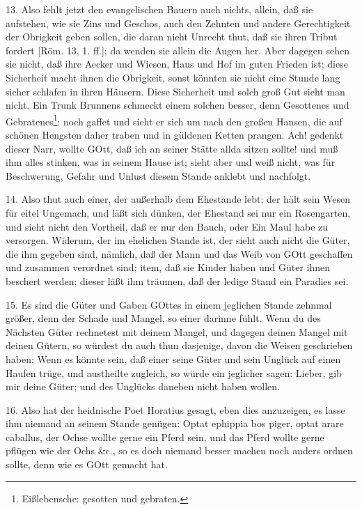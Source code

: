 13. Also fehlt jetzt den evangelischen Bauern auch nichts, allein, daß sie aufstehen, wie sie Zins und Geschos, auch den Zehnten und andere Gerechtigkeit der Obrigkeit geben sollen, die daran nicht Unrecht thut, daß sie ihren Tribut fordert [Röm. 13, 1. ff.]; da wenden sie allein die Augen her. Aber dagegen sehen sie nicht, daß ihre Aecker und Wiesen, Haus und Hof im guten Frieden ist; diese Sicherheit macht ihnen die Obrigkeit, sonst könnten sie nicht eine Stunde lang sicher schlafen in ihren Häusern. Diese Sicherheit und solch groß Gut sieht man nicht. Ein Trunk Brunnens schmeckt einem solchen besser, denn Gesottenes und Gebratenes\footnote{Eißlebensche: gesotten und gebraten.}: noch gaffet und sieht er sich um nach den großen Hansen, die auf schönen Hengsten daher traben und in güldenen Ketten prangen. Ach! gedenkt dieser Narr, wollte GOtt, daß ich an seiner Stätte allda sitzen sollte! und muß ihm alles stinken, was in seinem Hause ist; sieht aber und weiß nicht, was für Beschwerung, Gefahr und Unlust diesem Stande anklebt und nachfolgt.

14. Also thut auch einer, der außerhalb dem Ehestande lebt; der hält sein Wesen für eitel Ungemach, und läßt sich dünken, der Ehestand sei nur ein Rosengarten, und sieht nicht den Vortheil, daß er nur den Bauch, oder Ein Maul habe zu versorgen. Widerum, der im ehelichen Stande ist, der sieht auch nicht die Güter, die ihm gegeben sind, nämlich, daß der Mann und das Weib von GOtt geschaffen und zusammen verordnet sind; item, daß sie Kinder haben und Güter ihnen beschert werden; dieser läßt ihm träumen, daß der ledige Stand ein Paradies sei.

15. Es sind die Güter und Gaben GOttes in einem jeglichen Stande zehnmal größer, denn der Schade und Mangel, so einer darinne fühlt. Wenn du des Nächsten Güter rechnetest mit deinem Mangel, und dagegen deinen Mangel mit deinen Gütern, so würdest du auch thun dasjenige, davon die Weisen geschrieben haben: Wenn es könnte sein, daß einer seine Güter und sein Unglück auf einen Haufen trüge, und austheilte zugleich, so würde ein jeglicher sagen: Lieber, gib mir deine Güter; und des Unglücks daneben nicht haben wollen.

16. Also hat der heidnische Poet Horatius gesagt, eben dies anzuzeigen, es lasse ihm niemand an seinem Stande genügen: Optat ephippia bos piger, optat arare caballus, der Ochse wollte gerne ein Pferd sein, und das Pferd wollte gerne pflügen wie der Ochs \&c., so es doch niemand besser machen noch anders ordnen sollte, denn wie es GOtt gemacht hat.

